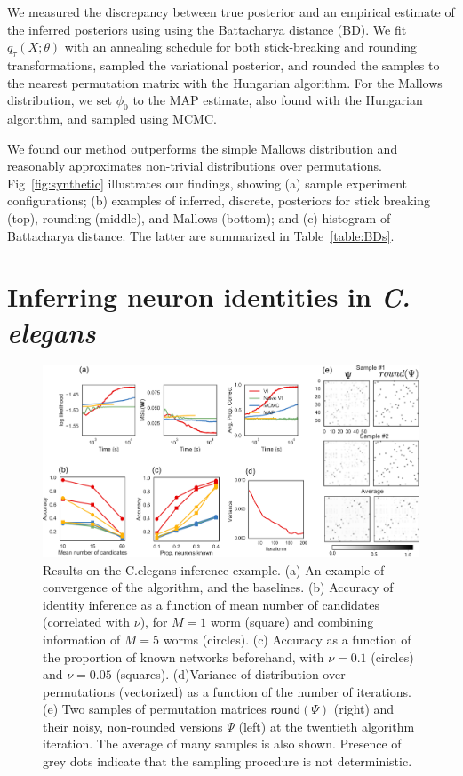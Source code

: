 \documentclass[twoside]{article}
\begin{document}
We measured the discrepancy between true posterior and an empirical
estimate of the inferred posteriors using using the Battacharya
distance (BD). We fit $q_\tau(X; \theta)$ with an annealing schedule
for both stick-breaking and rounding transformations, sampled the
variational posterior, and rounded the samples to the nearest
permutation matrix with the Hungarian algorithm. For the Mallows
distribution, we set $\phi_0$ to the MAP estimate, also found with the
Hungarian algorithm, and sampled using MCMC.
 
We found our method outperforms the simple Mallows distribution and
reasonably approximates non-trivial distributions over
permutations. Fig~\ref{fig:synthetic} illustrates our findings,
showing (a) sample experiment configurations; (b) examples of
inferred, discrete, posteriors for stick breaking (top), rounding
(middle), and Mallows (bottom); and (c) histogram of Battacharya distance.
The latter are summarized in Table~\ref{table:BDs}.


\section{Inferring neuron identities in \textit{C. elegans}}
\label{sec:celegans}

\begin{figure}[ht]
  \centering
  \includegraphics[width=6in]{../figures/figure7.pdf} 
  \caption{Results on the C.elegans inference example. (a) An example of convergence of the algorithm, and the baselines. (b) Accuracy of identity inference as a function of mean number of candidates (correlated with $\nu$), for $M=1$ worm (square) and combining information of $M=5$ worms (circles). (c) Accuracy as a function of the proportion of known networks beforehand,  with $\nu=0.1$ (circles) and $\nu=0.05$ (squares). (d)Variance of distribution over permutations (vectorized) as a function of the number of iterations. (e) Two samples of permutation matrices $\mathsf{round}(\Psi)$ (right) and their noisy, non-rounded versions $\Psi$ (left) at the twentieth algorithm iteration. The average of many samples is also shown. Presence of grey dots indicate that the sampling procedure is not deterministic.}
\label{fig:elegantresults}
\end{figure}
\end{document}
